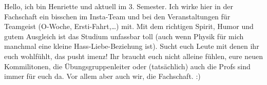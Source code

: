 \begin{multicols}{2}
{
Hello, ich bin Henriette und aktuell im 3. Semester. Ich wirke hier in der Fachschaft ein bisschen im Insta-Team und bei den Veranstaltungen für Teamgeist (O-Woche, Ersti-Fahrt,…) mit. 
Mit dem richtigen Spirit, Humor und gutem Ausgleich ist das Studium unfassbar toll (auch wenn Physik für mich manchmal eine kleine Hass-Liebe-Beziehung ist).
Sucht euch Leute mit denen ihr euch wohlfühlt, das pusht imenz! 
Ihr braucht euch nicht alleine fühlen, eure neuen Kommilitonen, die Übungsgruppenleiter oder (tatsächlich) auch die Profs sind immer für euch da. Vor allem aber auch wir, die Fachschaft. :)
}

\vspace{-0.2cm}


\end{multicols}
